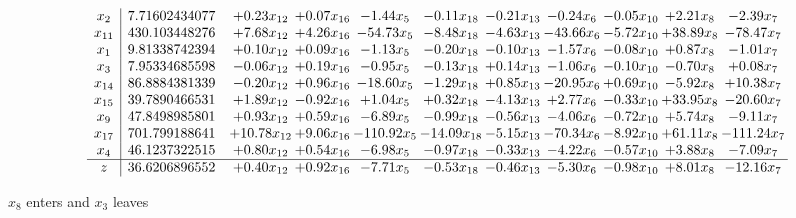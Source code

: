 \documentclass[9pt]{article}
\begin{document}
 \[\begin{array}{c| c c@{\hskip 2pt} c@{\hskip 2pt} c@{\hskip 2pt} c@{\hskip 2pt} c@{\hskip 2pt} c@{\hskip 2pt} c@{\hskip 2pt} c@{\hskip 2pt} c@{\hskip 2pt} }
 x_{2}   &  7.71602434077 & +  0.23 x_{12} & +  0.07 x_{16} & -1.44 x_{5} & -0.11 x_{18} & -0.21 x_{13} & -0.24 x_{6} & -0.05 x_{10} & +  2.21 x_{8} & -2.39 x_{7}\\
 x_{11}   &  430.103448276 & +  7.68 x_{12} & +  4.26 x_{16} & -54.73 x_{5} & -8.48 x_{18} & -4.63 x_{13} & -43.66 x_{6} & -5.72 x_{10} & + 38.89 x_{8} & -78.47 x_{7}\\
 x_{1}   &  9.81338742394 & +  0.10 x_{12} & +  0.09 x_{16} & -1.13 x_{5} & -0.20 x_{18} & -0.10 x_{13} & -1.57 x_{6} & -0.08 x_{10} & +  0.87 x_{8} & -1.01 x_{7}\\
 x_{3}   &  7.95334685598 & -0.06 x_{12} & +  0.19 x_{16} & -0.95 x_{5} & -0.13 x_{18} & +  0.14 x_{13} & -1.06 x_{6} & -0.10 x_{10} & -0.70 x_{8} & +  0.08 x_{7}\\
 x_{14}   &  86.8884381339 & -0.20 x_{12} & +  0.96 x_{16} & -18.60 x_{5} & -1.29 x_{18} & +  0.85 x_{13} & -20.95 x_{6} & +  0.69 x_{10} & -5.92 x_{8} & + 10.38 x_{7}\\
 x_{15}   &  39.7890466531 & +  1.89 x_{12} & -0.92 x_{16} & +  1.04 x_{5} & +  0.32 x_{18} & -4.13 x_{13} & +  2.77 x_{6} & -0.33 x_{10} & + 33.95 x_{8} & -20.60 x_{7}\\
 x_{9}   &  47.8498985801 & +  0.93 x_{12} & +  0.59 x_{16} & -6.89 x_{5} & -0.99 x_{18} & -0.56 x_{13} & -4.06 x_{6} & -0.72 x_{10} & +  5.74 x_{8} & -9.11 x_{7}\\
 x_{17}   &  701.799188641 & + 10.78 x_{12} & +  9.06 x_{16} & -110.92 x_{5} & -14.09 x_{18} & -5.15 x_{13} & -70.34 x_{6} & -8.92 x_{10} & + 61.11 x_{8} & -111.24 x_{7}\\
 x_{4}   &  46.1237322515 & +  0.80 x_{12} & +  0.54 x_{16} & -6.98 x_{5} & -0.97 x_{18} & -0.33 x_{13} & -4.22 x_{6} & -0.57 x_{10} & +  3.88 x_{8} & -7.09 x_{7}\\
\hline
z    &  36.6206896552 & +  0.40 x_{12} & +  0.92 x_{16} & -7.71 x_{5} & -0.53 x_{18} & -0.46 x_{13} & -5.30 x_{6} & -0.98 x_{10} & +  8.01 x_{8} & -12.16 x_{7}\\
\end{array}\]


 $ x_{8} $ enters and $ x_{3} $ leaves 
\end{document}
